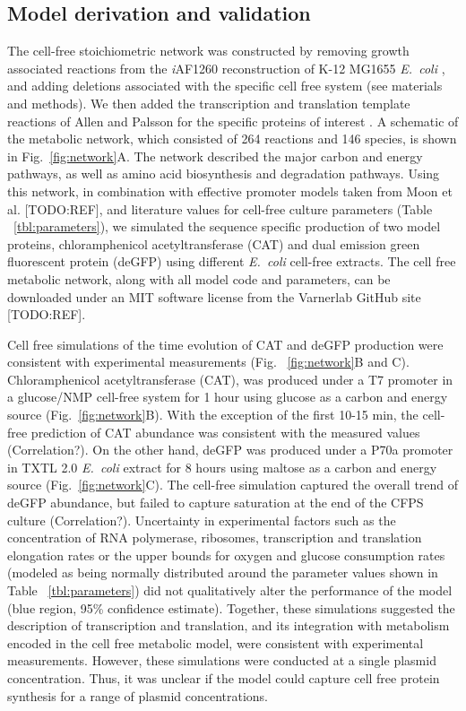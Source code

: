 \documentclass[journal=asbcd6,manuscript=article]{achemso}
\begin{document}
\subsection{Model derivation and validation}
The cell-free stoichiometric network was constructed by removing growth associated reactions from the \textit{i}AF1260 reconstruction of K-12 MG1655 \textit{E.~coli} \cite{Feist:2007aa},
and adding deletions associated with the specific cell free system (see materials and methods).
We then added the transcription and translation template reactions of Allen and Palsson for the specific proteins of interest \cite{Allen:2003aa}.
A schematic of the metabolic network, which consisted of 264 reactions and 146 species, is shown in Fig.~\ref{fig:network}A.
The network described the major carbon and energy pathways, as well as amino acid biosynthesis and degradation pathways.
Using this network, in combination with effective promoter models taken from Moon et al. [TODO:REF], and literature values for cell-free culture parameters (Table ~\ref{tbl:parameters}),
we simulated the sequence specific production of two model proteins, chloramphenicol acetyltransferase (CAT) and dual emission green fluorescent protein (deGFP) using
different \textit{E.~coli} cell-free extracts.
The cell free metabolic network, along with all model code and parameters, can be downloaded under an MIT software license from the Varnerlab GitHub site [TODO:REF].

Cell free simulations of the time evolution of CAT and deGFP production were consistent with experimental measurements (Fig. ~\ref{fig:network}B and C).
Chloramphenicol acetyltransferase (CAT), was produced under a T7 promoter in a glucose/NMP cell-free system \cite{2005_calhoun_BiotechnologyProgress}
for 1 hour using glucose as a carbon and energy source (Fig.~\ref{fig:network}B).
With the exception of the first 10-15 min, the cell-free prediction of CAT abundance was consistent with the measured values (Correlation?).
On the other hand, deGFP was produced under a P70a promoter in TXTL 2.0 \textit{E.~coli} extract for 8 hours using maltose as a carbon and energy source (Fig.~\ref{fig:network}C).
The cell-free simulation captured the overall trend of deGFP abundance, but failed to capture saturation at the end of the CFPS culture (Correlation?).
Uncertainty in experimental factors such as the concentration of RNA polymerase, ribosomes,
transcription and translation elongation rates or the upper bounds for oxygen and glucose consumption rates (modeled as being normally distributed around the parameter values shown in Table ~\ref{tbl:parameters})
did not qualitatively alter the performance of the model (blue region, 95\% confidence estimate).
Together, these simulations suggested the description of transcription and translation, and its integration with metabolism encoded in the cell free metabolic model, were consistent with experimental measurements.
However, these simulations were conducted at a single plasmid concentration.
Thus, it was unclear if the model could capture cell free protein synthesis for a range of plasmid concentrations.
\end{document}

